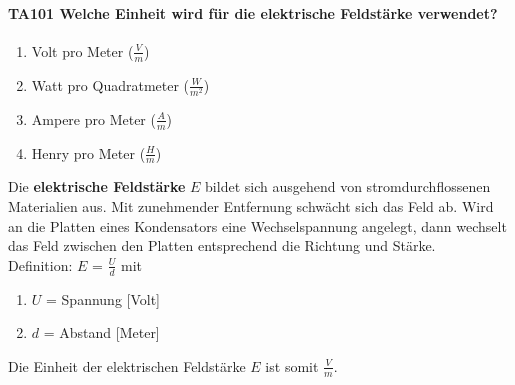 \documentclass[8pt]{article}
\begin{document}
\paragraph*{TA101 Welche Einheit wird für die elektrische Feldstärke verwendet?}
\begin{enumerate}[nolistsep,label=\Alph*]
\item Volt pro Meter ($\frac{V}{m}$)
\item Watt pro Quadratmeter ($\frac{W}{m^{2}}$)
\item Ampere pro Meter ($\frac{A}{m}$)
\item Henry pro Meter ($\frac{H}{m}$)
\end{enumerate}
Die \textbf{elektrische Feldstärke} $E$ bildet sich ausgehend von stromdurchflossenen Materialien aus. Mit zunehmender Entfernung schwächt sich das Feld ab. Wird an die Platten eines Kondensators eine Wechselspannung angelegt, dann wechselt das Feld zwischen den Platten entsprechend die Richtung und Stärke.\\
Definition: $E$ = $\frac{U}{d}$ mit 
\begin{enumerate}
\item $U$ = Spannung [Volt]
\item $d$ = Abstand [Meter]
\end{enumerate}
Die Einheit der elektrischen Feldstärke $E$ ist somit $\frac{V}{m}$.
\end{document}

